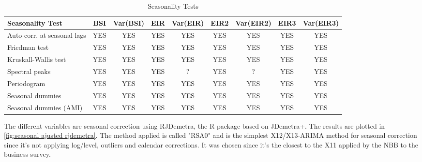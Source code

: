 \documentclass[12pt,a4paper,oneside]{book}
\begin{document}
\begin{table}[htp!]
    \centering \footnotesize
    \begin{tabular}{l|c|c|c|c|c|c|c|c}
\textbf{Seasonality Test} & BSI & Var(BSI) & EIR & Var(EIR) & EIR2 & Var(EIR2) & EIR3 & Var(EIR3) \\ \hline
Auto-corr. at seasonal lags& YES & YES & YES & YES & YES & YES & YES & YES \\
Friedman test       & YES   & YES & YES & YES & YES & YES & YES & YES \\
Kruskall-Wallis test & YES   & YES & YES & YES & YES & YES & YES & YES \\
Spectral peaks                  & YES   & YES & YES & ? & YES & ? & YES & YES \\
Periodogram                     & YES   & YES & YES & YES & YES & YES & YES & YES \\
Seasonal dummies                & YES   & YES & YES & YES & YES & YES & YES & YES \\
Seasonal dummies (AMI)          & YES   & YES & YES & YES & YES & YES & YES & YES \\
    \end{tabular}
    \caption{Seasonality Tests}
    \label{tab:Seasonality Tests}
\end{table}



The different variables are seasonal correction using RJDemetra, the R package based on JDemetra+.
The results are plotted in \autoref{fig:seasonal ajusted rjdemetra}.
The method applied is called "RSA0" and is the simplest X12/X13-ARIMA method for seasonal correction since it's not applying log/level, outliers and calendar corrections. 
It was chosen since it's the closest to the X11 applied by the NBB to the business survey.
\end{document}
